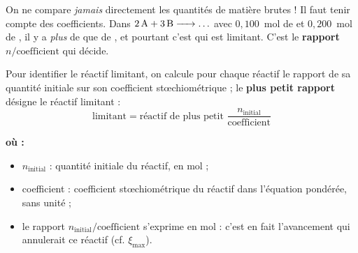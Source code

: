 \documentclass[11pt,a4paper]{article}
\newenvironment{ou}{%
  \par\smallskip\noindent\textbf{où :}\nopagebreak
  \begin{itemize}[leftmargin=1.8em,topsep=2pt,itemsep=1.5pt,parsep=0pt]}%
  {\end{itemize}}
\begin{document}
\begin{attention}
On ne compare \emph{jamais} directement les quantités de matière brutes ! Il faut tenir compte des
coefficients. Dans $\ce{2A + 3B -> \ldots}$ avec $0,100$~mol de  et $0,200$~mol de , il
y a \emph{plus} de  que de , et pourtant c'est  qui est limitant. C'est le
\textbf{rapport} $n/\text{coefficient}$ qui décide.
\end{attention}

\begin{theoreme}
Pour identifier le réactif limitant, on calcule pour chaque réactif le rapport de sa quantité
initiale sur son coefficient stœchiométrique ; le \textbf{plus petit rapport} désigne le réactif
limitant :
\[
\boxed{\;\text{limitant} = \text{réactif de plus petit } \dfrac{n_{\text{initial}}}{\text{coefficient}}\;}
\]
\end{theoreme}

\begin{ou}
  \item $n_{\text{initial}}$ : quantité initiale du réactif, en \si{\mole} ;
  \item coefficient : coefficient stœchiométrique du réactif dans l'équation pondérée, sans unité ;
  \item le rapport $n_{\text{initial}}/\text{coefficient}$ s'exprime en \si{\mole} : c'est en fait
        l'avancement qui annulerait ce réactif (cf. $\xi_{\max}$).
\end{ou}
\end{document}
